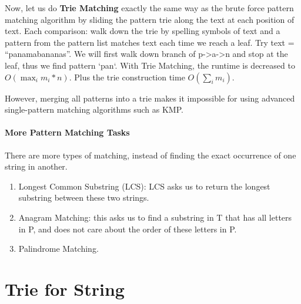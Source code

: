 \documentclass[../main.tex]{subfiles}
\begin{document}
Now, let us do \textbf{Trie Matching} exactly the same way as the brute force pattern matching algorithm by sliding the pattern trie along the text at each position of text. Each comparison: walk down the trie by spelling symbols of text and a pattern from the pattern list matches text each time we reach a leaf. Try text = ``panamabananas''. We will first walk down branch of p->a->n and stop at the leaf, thus we find pattern `pan`. With Trie Matching, the runtime is decreased to $O(\max_i{m_i*n})$. Plus the trie construction time $O(\sum_i{m_i})$. 

However, merging all patterns into a trie makes it impossible for using advanced single-pattern matching algorithms such as KMP. 

\paragraph{More Pattern Matching Tasks} There are more types of matching, instead of finding the exact occurrence of one string in another.
\begin{enumerate}
    \item Longest Common Substring (LCS): LCS asks us to return the longest substring between these two strings.
    \item Anagram Matching: this asks us to find a substring in T that has all letters in P, and does not care about the order of these letters in P.
    \item Palindrome Matching.
\end{enumerate}

\section{Trie for String}
\label{concept_trie}
\end{document}
